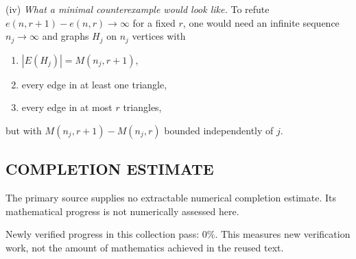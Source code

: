 (iv) \emph{What a minimal counterexample would look like.} To refute $e(n,r+1)-e(n,r)\to\infty$ for a fixed $r$, one would need an infinite sequence $n_j\to\infty$ and graphs $H_j$ on $n_j$ vertices with
\begin{enumerate}
\item $|E(H_j)|=M(n_j,r+1)$,
\item every edge in at least one triangle,
\item every edge in at most $r$ triangles,
\end{enumerate}
but with $M(n_j,r+1)-M(n_j,r)$ bounded independently of $j$.




\subsection*{COMPLETION ESTIMATE}
The primary source supplies no extractable numerical completion estimate. Its mathematical progress is not numerically assessed here.

Newly verified progress in this collection pass: $0\%$. This measures new verification work, not the amount of mathematics achieved in the reused text.
